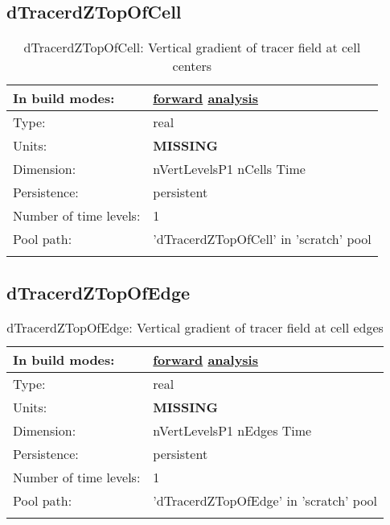 \subsection[dTracerdZTopOfCell]{dTracerdZTopOfCell}
\label{subsec:var_sec_scratch_dTracerdZTopOfCell}
\begin{center}
\begin{longtable}{| p{2.0in} | p{4.0in} |}
        \hline 
        In build modes: & \hyperref[subsec:forward_var_tab_scratch]{forward} \hyperref[subsec:analysis_var_tab_scratch]{analysis} \\
        \hline 
        Type: & real \\
        \hline 
        Units: & {\bf \color{red} MISSING} \\
        \hline 
        Dimension: & nVertLevelsP1 nCells Time \\
        \hline 
        Persistence: & persistent \\
        \hline 
        Number of time levels: & 1 \\
        \hline 
            Pool path: & 'dTracerdZTopOfCell' in 'scratch' pool
 \\
		 \hline 
    \caption{dTracerdZTopOfCell: Vertical gradient of tracer field at cell centers}
\end{longtable}
\end{center}
\subsection[dTracerdZTopOfEdge]{dTracerdZTopOfEdge}
\label{subsec:var_sec_scratch_dTracerdZTopOfEdge}
\begin{center}
\begin{longtable}{| p{2.0in} | p{4.0in} |}
        \hline 
        In build modes: & \hyperref[subsec:forward_var_tab_scratch]{forward} \hyperref[subsec:analysis_var_tab_scratch]{analysis} \\
        \hline 
        Type: & real \\
        \hline 
        Units: & {\bf \color{red} MISSING} \\
        \hline 
        Dimension: & nVertLevelsP1 nEdges Time \\
        \hline 
        Persistence: & persistent \\
        \hline 
        Number of time levels: & 1 \\
        \hline 
            Pool path: & 'dTracerdZTopOfEdge' in 'scratch' pool
 \\
		 \hline 
    \caption{dTracerdZTopOfEdge: Vertical gradient of tracer field at cell edges}
\end{longtable}
\end{center}
